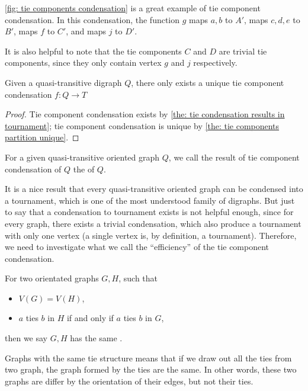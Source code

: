 \cref{fig: tie components condensation} is a great example of
tie component condensation.
In this condensation, the function \(g\) maps \(a, b\) to \(A'\),
maps \(c, d, e\) to \(B'\), maps \(f\) to \(C'\),
and maps \(j\) to \(D'\).

It is also helpful to note that the tie components \(C\) and \(D\)
are trivial tie components,
since they only contain vertex \(g\) and \(j\) respectively.

\begin{corollary}
  Given a quasi-transitive digraph \(Q\),
  there only exists a unique tie component condensation
  \(f: Q \to T\)
\end{corollary}
\begin{proof}
  Tie component condensation exists by
  \cref{the: tie condensation results in tournament};
  tie component condensation is unique
  by \cref{the: tie components partition unique}.
\end{proof}

\begin{definition}
  For a given quasi-transitive oriented graph \(Q\),
  we call the result of tie component condensation of \(Q\)
  the  of \(Q\).
\end{definition}

It is a nice result that every
quasi-transitive oriented graph
can be condensed into a tournament,
which is one of the most understood family of digraphs.
But just to say that a condensation to tournament exists
is not helpful enough,
since for every graph, there exists a trivial condensation,
which also produce a tournament with only one vertex
(a single vertex is, by definition, a tournament).
Therefore, we need to investigate what we call
the ``efficiency'' of the tie component condensation.

\begin{definition}
  For two orientated graphs \(G, H\), such that
  \begin{itemize}
    \item \(V(G) = V(H)\),
    \item \(a\) ties \(b\) in \(H\) if and only if
      \(a\) ties \(b\) in \(G\),
  \end{itemize}
  then we say \(G, H\) has the same .
\end{definition}

Graphs with the same tie structure means
that if we draw out all the ties from two graph,
the graph formed by the ties are the same.
In other words, these two graphs are differ
by the orientation of their edges, but not their ties.

